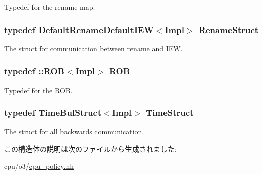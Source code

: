 \label{structSimpleCPUPolicy_a562b8208c64b62e61ceee341d2931e5c}
Typedef for the rename map. \hypertarget{structSimpleCPUPolicy_a68ba62cd715a499d033ad5e7b96aba8c}{
\subsubsection[{RenameStruct}]{\setlength{\rightskip}{0pt plus 5cm}typedef {\bf DefaultRenameDefaultIEW}$<$Impl$>$ {\bf RenameStruct}}}
\label{structSimpleCPUPolicy_a68ba62cd715a499d033ad5e7b96aba8c}
The struct for communication between rename and IEW. \hypertarget{structSimpleCPUPolicy_a0b7880d092bb7add137501986fbc6ced}{
\subsubsection[{ROB}]{\setlength{\rightskip}{0pt plus 5cm}typedef ::{\bf ROB}$<$Impl$>$ {\bf ROB}}}
\label{structSimpleCPUPolicy_a0b7880d092bb7add137501986fbc6ced}
Typedef for the \hyperlink{classROB}{ROB}. \hypertarget{structSimpleCPUPolicy_a057b9e5b595b4bef4e9c8b4df494845f}{
\subsubsection[{TimeStruct}]{\setlength{\rightskip}{0pt plus 5cm}typedef {\bf TimeBufStruct}$<$Impl$>$ {\bf TimeStruct}}}
\label{structSimpleCPUPolicy_a057b9e5b595b4bef4e9c8b4df494845f}
The struct for all backwards communication. 

この構造体の説明は次のファイルから生成されました:\begin{DoxyCompactItemize}
\item 
cpu/o3/\hyperlink{cpu__policy_8hh}{cpu\_\-policy.hh}\end{DoxyCompactItemize}
